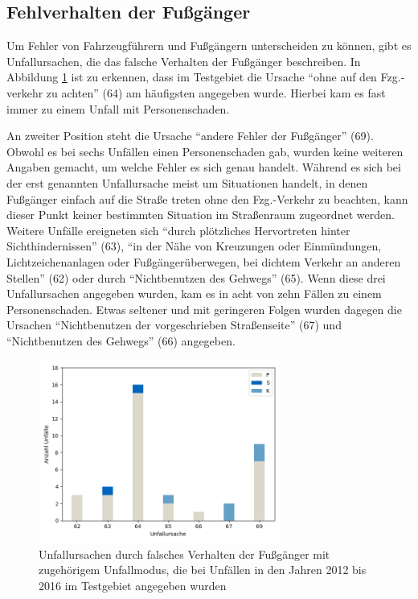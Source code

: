 \subsection{Fehlverhalten der Fußgänger}
Um Fehler von Fahrzeugführern und Fußgängern unterscheiden zu können, gibt es Unfallursachen, die das falsche Verhalten der Fußgänger beschreiben. In Abbildung \ref{fig:Fehlverhalten_Fussgaenger} ist zu erkennen, dass im Testgebiet die Ursache \enquote{ohne auf den Fzg.-verkehr zu achten} (64) am häufigsten angegeben wurde. Hierbei kam es fast immer zu einem Unfall mit Personenschaden.

An zweiter Position steht die Ursache \enquote{andere Fehler der Fußgänger} (69). Obwohl es bei sechs Unfällen einen Personenschaden gab, wurden keine weiteren Angaben gemacht, um welche Fehler es sich genau handelt. Während es sich bei der erst genannten Unfallursache meist um Situationen handelt, in denen Fußgänger einfach auf die Straße treten ohne den Fzg.-Verkehr zu beachten, kann dieser Punkt keiner bestimmten Situation im Straßenraum zugeordnet werden. Weitere Unfälle ereigneten sich \enquote{durch plötzliches Hervortreten hinter Sichthindernissen} (63), \enquote{in der Nähe von Kreuzungen oder Einmündungen, Lichtzeichenanlagen oder Fußgängerüberwegen, bei dichtem Verkehr an anderen Stellen} (62) oder durch \enquote{Nichtbenutzen des Gehwegs} (65). Wenn diese drei Unfallursachen angegeben wurden, kam es in acht von zehn Fällen zu einem Personenschaden. Etwas seltener und mit geringeren Folgen wurden dagegen die Ursachen \enquote{Nichtbenutzen der vorgeschrieben Straßenseite} (67) und \enquote{Nichtbenutzen des Gehwegs} (66) angegeben.

\begin{savenotes}
	\begin{figure}[H]
		\centering
		\includegraphics[width=8cm,height=6cm]{figures/Urs_Fussgaenger}
		\caption[Unfallursachen durch falsches Verhalten der Fußgänger mit zugehörigem Unfallmodus, die bei Unfällen in den Jahren 2012 bis 2016 im Testgebiet angegeben wurden]{Unfallursachen durch falsches Verhalten der Fußgänger mit zugehörigem Unfallmodus, die bei Unfällen in den Jahren 2012 bis 2016 im Testgebiet angegeben wurden}\label{fig:Fehlverhalten_Fussgaenger}
	\end{figure}
\end{savenotes}

